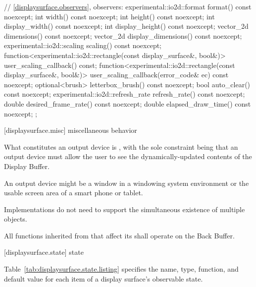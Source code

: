 \begin{codeblock}
{{{{{    // \ref{displaysurface.observers}, observers:
    experimental::io2d::format format() const noexcept;
    int width() const noexcept;
    int height() const noexcept;
    int display_width() const noexcept;
    int display_height() const noexcept;
    vector_2d dimensions() const noexcept;
    vector_2d display_dimensions() const noexcept;
    experimental::io2d::scaling scaling() const noexcept;
    function<experimental::io2d::rectangle(const display_surface&,
      bool&)> user_scaling_callback() const;
    function<experimental::io2d::rectangle(const display_surface&,
      bool&)> user_scaling_callback(error_code& ec) const noexcept;
    optional<brush> letterbox_brush() const noexcept;
    bool auto_clear() const noexcept;
    experimental::io2d::refresh_rate refresh_rate() const noexcept;
    double desired_frame_rate() const noexcept;
    double elapsed_draw_time() const noexcept;
  };
} } } }
\end{codeblock}

 [displaysurface.misc] { miscellaneous behavior}%

\pnum
What constitutes an output device is , with the sole constraint being that an output device must allow the user to see the dynamically-updated contents of the Display Buffer.
\begin{example}
An output device might be a window in a windowing system environment or the usable screen area of a smart phone or tablet.
\end{example}

\pnum
Implementations do not need to support the simultaneous existence of multiple  objects.

\pnum
All functions inherited from  that affect its \underlyingsurface shall operate on the Back Buffer.

 [displaysurface.state] { state}

\pnum
Table~\ref{tab:displaysurface.state.listing} specifies the name, type, function, and default value for each item of a display surface's observable state.

